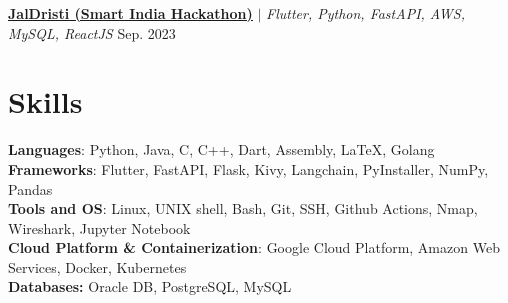 
\resumeProjectHeading
{\textbf{\href{https://github.com/AM-ash-OR-AM-I/jaldristi}{\underline{JalDristi (Smart India Hackathon)}}} $|$ \emph{ Flutter, Python, FastAPI, AWS, MySQL, ReactJS }} {Sep. 2023 }
\resumeItemListStart
{}
\resumeItemListEnd

\resumeSubHeadingListEnd

%
\vspace{-10px}
\section{Skills}
\begin{itemize}[leftmargin=0.15in, label={}]
  \small{\item{
        \textbf{Languages}{: Python, Java, C, C++, Dart, Assembly, LaTeX, Golang} \\
        \textbf{Frameworks}{: Flutter, FastAPI, Flask, Kivy, Langchain, PyInstaller, NumPy, Pandas} \\
        \textbf{Tools and OS}{: Linux, UNIX shell, Bash, Git, SSH, Github Actions, Nmap, Wireshark, Jupyter Notebook} \\
        \textbf{Cloud Platform \& Containerization}{: Google Cloud Platform, Amazon Web Services, Docker, Kubernetes} \\
        \textbf{Databases: }{Oracle DB, PostgreSQL, MySQL} \\
        }}

\end{itemize}


